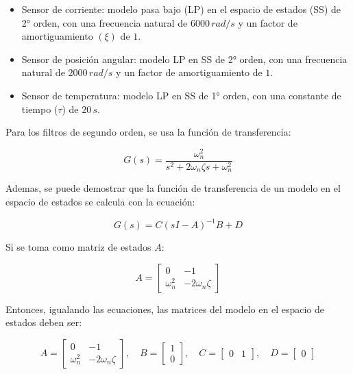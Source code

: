 \documentclass{article}
\begin{document}
\begin{itemize}
    \item Sensor de corriente: modelo pasa bajo (LP) en el espacio de estados (SS) de 2° orden, 
    con una frecuencia natural de $6000\,rad/s$ y un factor de amortiguamiento $(\xi)$ de $1$.

    \item Sensor de posición angular: modelo LP en SS de 2° orden, con una frecuencia natural de 
    $2000\,rad/s$ y un factor de amortiguamiento de $1$.

    \item Sensor de temperatura: modelo LP en SS de 1° orden, con una constante de tiempo ($\tau$)  
    de $20\,s$.
\end{itemize}

Para los filtros de segundo orden, se usa la función de transferencia:

\begin{equation}
    G(s) = \frac{\omega_n^2}{s^2 + 2\omega_n\zeta s + \omega_n^2}
\end{equation}

Ademas, se puede demostrar que la función de transferencia de un modelo en el espacio de estados se 
calcula con la ecuación:

\begin{equation}
    G(s) = C(sI - A)^{-1}B + D
\end{equation}

Si se toma como matriz de estados $A$:

\[
A = \begin{bmatrix}
0 & -1 \\
\omega_n^2 & -2\omega_n\zeta
\end{bmatrix}
\]

Entonces, igualando las ecuaciones, las matrices del modelo en el espacio de estados deben ser:

\[
A = \begin{bmatrix}
0 & -1 \\
\omega_n^2 & -2\omega_n\zeta
\end{bmatrix}, \quad
B = \begin{bmatrix}
1 \\
0
\end{bmatrix}, \quad
C = \begin{bmatrix}
0 & 1
\end{bmatrix}, \quad
D = \begin{bmatrix}
0
\end{bmatrix}
\]
\end{document}
